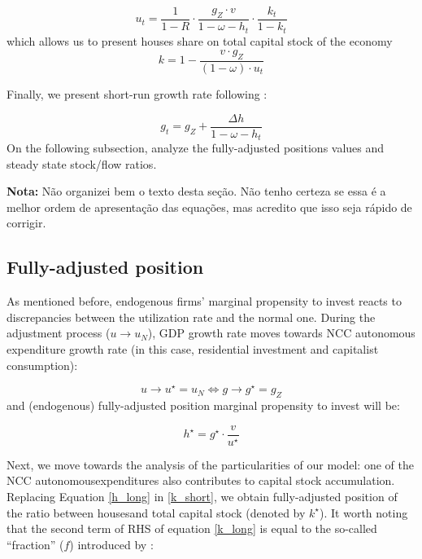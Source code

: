\documentclass[11pt]{article}
\begin{document}
\begin{equation}
\label{u_houses}
u_{t} = \frac{1}{1-R}\cdot \frac{g_Z\cdot v}{1 - \omega - h_{t}}\cdot \frac{k_{t}}{1-k_{t}}
\end{equation}
which allows us to present houses share on total capital stock of the economy
\begin{equation}
\label{k_short}
k = 1 - \frac{v\cdot g_Z}{(1 - \omega)\cdot u_{t}}
\end{equation}


Finally, we present short-run growth rate following \textcite{freitas_growth_2015}:

\begin{equation}
\label{g_short}
g_t = g_{Z} + \frac{\Delta h}{1 - \omega - h_{t}}
\end{equation}
On the following subsection, analyze the fully-adjusted positions values and steady state stock/flow ratios.


\textbf{Nota:} Não organizei bem o texto desta seção. Não tenho certeza se essa é a melhor ordem de apresentação das equações, mas acredito que isso seja rápido de corrigir.

\subsection{Fully-adjusted position}
\label{sec:org4bdf92e}
\label{long}


As mentioned before, endogenous firms’ marginal propensity to invest reacts to discrepancies between the utilization rate and the normal one.  During the adjustment process (\(u\to u_N\)), GDP growth rate moves towards NCC autonomous expenditure growth rate (in this case, residential investment and capitalist consumption):

$$
u \to u^{\star}  = u_N \Leftrightarrow g \to g^{\star} = g_Z
$$
and (endogenous) fully-adjusted position marginal propensity to invest will be:


\begin{equation}
\label{h_long}
h^{\star} = g^{\star}\cdot \frac{v}{u^{\star}}
\end{equation}

Next, we move towards the analysis of the particularities of our model:  one of the NCC autonomousexpenditures also contributes to capital stock accumulation.  
Replacing Equation \ref{h_long} in \ref{k_short}, we obtain fully-adjusted position of the ratio between housesand total capital stock (denoted by \(k^\star\)). It worth noting that the second term of RHS of equation \ref{k_long} is equal to the so-called ``fraction'' (\(f\)) introduced by \textcite{serrano_long_1995}:
\end{document}
